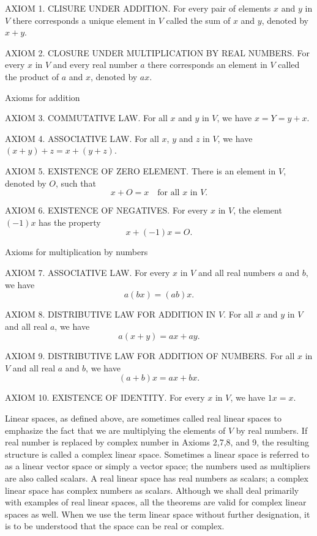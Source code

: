 \documentclass[cn,11pt,chinese]{elegantbook}
\numberwithin{equation}{section}
\begin{document}
AXIOM 1. CLISURE UNDER ADDITION. For every pair of elements $x$ and $y$ in $V$ there corresponds a unique element in $V$ called the sum of $x$ and $y$, denoted by $x + y$.

AXIOM 2. CLOSURE UNDER MULTIPLICATION BY REAL NUMBERS. For every $x$ in $V$ and every real number $a$ there corresponds an element in $V$ called the product of $a$ and $x$, denoted by $ax$.

Axioms for addition

AXIOM 3. COMMUTATIVE LAW. For all $x$ and $y$ in $V$, we have $x = Y = y + x$.

AXIOM 4. ASSOCIATIVE LAW. For all $x$, $y$ and $z$ in $V$, we have $(x + y) + z = x + (y + z)$.

AXIOM 5. EXISTENCE OF ZERO ELEMENT. There is an element in $V$, denoted by $O$, such that 
\[
x+ O = x \quad \text{for all $x$ in $V$}.
\]

AXIOM 6. EXISTENCE OF NEGATIVES. For every $x$ in $V$, the element $(-1)x$ has the property
\[
x + (-1)x = O.
\]

Axioms for multiplication by numbers

AXIOM 7. ASSOCIATIVE LAW. For every $x$ in $V$ and all real numbers $a$ and $b$, we have 
\[
a(bx) = (ab)x.
\]

AXIOM 8. DISTRIBUTIVE LAW FOR ADDITION IN $V$. For all $x$ and $y$ in $V$ and all real $a$, we have
\[
a(x+y) = ax + ay.
\]

AXIOM 9. DISTRIBUTIVE LAW FOR ADDITION OF NUMBERS. For all $x$ in $V$ and all real $a$ and $b$, we have
\[
(a+b)x = ax + bx.
\]

AXIOM 10. EXISTENCE OF IDENTITY. For every $x$ in $V$, we have $1x = x$.

Linear spaces, as defined above, are sometimes called real linear spaces to emphasize the fact that we are multiplying the elements of $V$ by real numbers. If real number is replaced by complex number in Axioms 2,7,8, and 9, the resulting structure is called a complex linear space. Sometimes a linear space is referred to as a linear vector space or simply a vector space; the numbers used as multipliers are also called scalars. A real linear space has real numbers as scalars; a complex linear space has complex numbers as scalars. Although we shall deal primarily with examples of real linear spaces, all the theorems are valid for complex linear spaces as well. When we use the term linear space without further designation, it is to be understood that the space can be real or complex.
\end{document}

